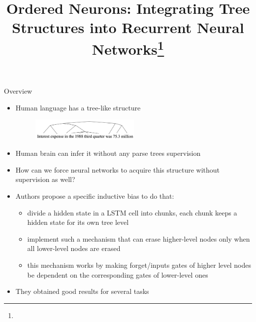 \documentclass[handout, 10pt]{beamer}
\title{Ordered Neurons: Integrating Tree Structures into Recurrent Neural Networks\footnote{\citepaper{OrderedNeurons}}}
\begin{document}
\begin{frame}
    \titlepage
\end{frame}

\begin{frame}{Overview}
    \begin{itemize}
        \item\pause Human language has a tree-like structure
        \begin{figure}
            \centering
            \includegraphics[width=0.5\textwidth]{images/tree-structure.png}
        \end{figure}
        \item\pause Human brain can infer it without any parse trees supervision
        \item\pause How can we force neural networks to acquire this structure without supervision as well?
        \item\pause Authors propose a specific inductive bias to do that:
        \begin{itemize}
            \item\pause divide a hidden state in a LSTM cell into chunks, each chunk keeps a hidden state for its own tree level
            \item\pause implement such a mechanism that can erase higher-level nodes only when all lower-level nodes are erased
            \item\pause this mechanism works by making forget/inputs gates of higher level nodes be dependent on the corresponding gates of lower-level ones
        \end{itemize}
        \item\pause They obtained good results for several tasks
    \end{itemize}
\end{frame}
\end{document}
